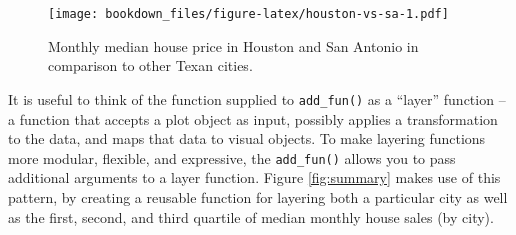 \documentclass[12pt,]{isuthesis}
\newenvironment{Shaded}{\begin{snugshade}}{\end{snugshade}}
\newcommand{\KeywordTok}[1]{\textcolor[rgb]{0.13,0.29,0.53}{\textbf{{#1}}}}
\newcommand{\DataTypeTok}[1]{\textcolor[rgb]{0.13,0.29,0.53}{{#1}}}
\newcommand{\FloatTok}[1]{\textcolor[rgb]{0.00,0.00,0.81}{{#1}}}
\newcommand{\StringTok}[1]{\textcolor[rgb]{0.31,0.60,0.02}{{#1}}}
\newcommand{\CommentTok}[1]{\textcolor[rgb]{0.56,0.35,0.01}{\textit{{#1}}}}
\newcommand{\OtherTok}[1]{\textcolor[rgb]{0.56,0.35,0.01}{{#1}}}
\newcommand{\NormalTok}[1]{{#1}}
\begin{document}
\begin{figure}[htbp]
\centering
\texttt{[image: bookdown\_files/figure-latex/houston-vs-sa-1.pdf]}
\caption{\label{fig:houston-vs-sa}Monthly median house price in Houston and
San Antonio in comparison to other Texan cities.}
\end{figure}

It is useful to think of the function supplied to \texttt{add\_fun()} as
a ``layer'' function -- a function that accepts a plot object as input,
possibly applies a transformation to the data, and maps that data to
visual objects. To make layering functions more modular, flexible, and
expressive, the \texttt{add\_fun()} allows you to pass additional
arguments to a layer function. Figure \ref{fig:summary} makes use of
this pattern, by creating a reusable function for layering both a
particular city as well as the first, second, and third quartile of
median monthly house sales (by city).

\begin{Shaded}
\end{Shaded}
\end{document}
